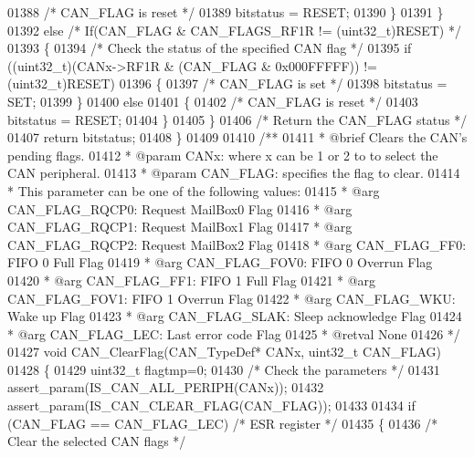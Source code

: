 \begin{DoxyCode}
01388       \textcolor{comment}{/* CAN\_FLAG is reset */}
01389       bitstatus = RESET;
01390     \}
01391   \}
01392   \textcolor{keywordflow}{else} \textcolor{comment}{/* If(CAN\_FLAG & CAN\_FLAGS\_RF1R != (uint32\_t)RESET) */}
01393   \{
01394     \textcolor{comment}{/* Check the status of the specified CAN flag */}
01395     \textcolor{keywordflow}{if} ((uint32\_t)(CANx->RF1R & (CAN\_FLAG & 0x000FFFFF)) != (uint32\_t)RESET)
01396     \{
01397       \textcolor{comment}{/* CAN\_FLAG is set */}
01398       bitstatus = SET;
01399     \}
01400     \textcolor{keywordflow}{else}
01401     \{
01402       \textcolor{comment}{/* CAN\_FLAG is reset */}
01403       bitstatus = RESET;
01404     \}
01405   \}
01406   \textcolor{comment}{/* Return the CAN\_FLAG status */}
01407   \textcolor{keywordflow}{return}  bitstatus;
01408 \}
01409 
01410 \textcolor{comment}{/**}
01411 \textcolor{comment}{  * @brief  Clears the CAN's pending flags.}
01412 \textcolor{comment}{  * @param  CANx: where x can be 1 or 2 to to select the CAN peripheral.}
01413 \textcolor{comment}{  * @param  CAN\_FLAG: specifies the flag to clear.}
01414 \textcolor{comment}{  *          This parameter can be one of the following values:}
01415 \textcolor{comment}{  *            @arg CAN\_FLAG\_RQCP0: Request MailBox0 Flag}
01416 \textcolor{comment}{  *            @arg CAN\_FLAG\_RQCP1: Request MailBox1 Flag}
01417 \textcolor{comment}{  *            @arg CAN\_FLAG\_RQCP2: Request MailBox2 Flag }
01418 \textcolor{comment}{  *            @arg CAN\_FLAG\_FF0: FIFO 0 Full Flag       }
01419 \textcolor{comment}{  *            @arg CAN\_FLAG\_FOV0: FIFO 0 Overrun Flag  }
01420 \textcolor{comment}{  *            @arg CAN\_FLAG\_FF1: FIFO 1 Full Flag        }
01421 \textcolor{comment}{  *            @arg CAN\_FLAG\_FOV1: FIFO 1 Overrun Flag     }
01422 \textcolor{comment}{  *            @arg CAN\_FLAG\_WKU: Wake up Flag}
01423 \textcolor{comment}{  *            @arg CAN\_FLAG\_SLAK: Sleep acknowledge Flag    }
01424 \textcolor{comment}{  *            @arg CAN\_FLAG\_LEC: Last error code Flag        }
01425 \textcolor{comment}{  * @retval None}
01426 \textcolor{comment}{  */}
01427 \textcolor{keywordtype}{void} CAN_ClearFlag(CAN\_TypeDef* CANx, uint32\_t CAN\_FLAG)
01428 \{
01429   uint32\_t flagtmp=0;
01430   \textcolor{comment}{/* Check the parameters */}
01431   assert_param(IS\_CAN\_ALL\_PERIPH(CANx));
01432   assert_param(IS\_CAN\_CLEAR\_FLAG(CAN\_FLAG));
01433 
01434   \textcolor{keywordflow}{if} (CAN\_FLAG == CAN_FLAG_LEC) \textcolor{comment}{/* ESR register */}
01435   \{
01436     \textcolor{comment}{/* Clear the selected CAN flags */}

\end{DoxyCode}

